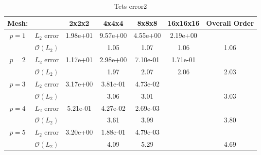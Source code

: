 \begin{table}[h]
\centering
\begin{tabular}{ c c c c c c c} 
  
 Mesh: &   & 2x2x2 & 4x4x4 & 8x8x8 & 16x16x16 & Overall Order \\ 
 \hline 
 \multirow{2}{*}{$p = 1$} & $L_2$ error & 1.98e+01 & 9.57e+00 & 4.55e+00 & 2.19e+00 &   \\ 
  
   & $\mathcal{O}(L_2)$ &   & 1.05 & 1.07 & 1.06 & 1.06 \\ 
 \hline 
 \multirow{2}{*}{$p = 2$} & $L_2$ error & 1.17e+01 & 2.98e+00 & 7.10e-01 & 1.71e-01 &   \\ 
  
   & $\mathcal{O}(L_2)$ &   & 1.97 & 2.07 & 2.06 & 2.03 \\ 
 \hline 
 \multirow{2}{*}{$p = 3$} & $L_2$ error & 3.17e+00 & 3.81e-01 & 4.73e-02 &   &   \\ 
  
   & $\mathcal{O}(L_2)$ &   & 3.06 & 3.01 &   & 3.03 \\ 
 \hline 
 \multirow{2}{*}{$p = 4$} & $L_2$ error & 5.21e-01 & 4.27e-02 & 2.69e-03 &   &   \\ 
  
   & $\mathcal{O}(L_2)$ &   & 3.61 & 3.99 &   & 3.80 \\ 
 \hline 
 \multirow{2}{*}{$p = 5$} & $L_2$ error & 3.20e+00 & 1.88e-01 & 4.79e-03 &   &   \\ 
  
   & $\mathcal{O}(L_2)$ &   & 4.09 & 5.29 &   & 4.69 \\ 
 \hline 
 \end{tabular}
\caption{Tets error2} 
 \end{table}
